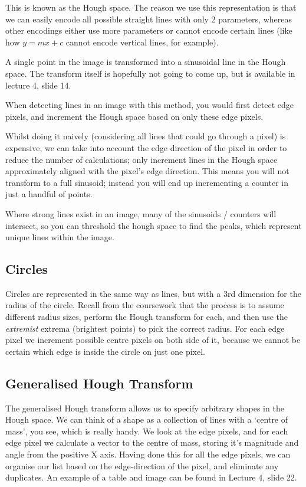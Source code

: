 \documentclass{article}
\begin{document}
    This is known as the Hough space. The reason we use this representation is that we can easily encode all possible straight lines with only 2 parameters, whereas other encodings either use more parameters or cannot encode certain lines (like how $y = mx + c$ cannot encode vertical lines, for example).
    
    A single point in the image is transformed into a sinusoidal line in the Hough space. The transform itself is hopefully not going to come up, but is available in lecture 4, slide 14.
    
    When detecting lines in an image with this method, you would first detect edge pixels, and increment the Hough space based on only these edge pixels.
    
    Whilst doing it naively (considering all lines that could go through a pixel) is expensive, we can take into account the edge direction of the pixel in order to reduce the number of calculations; only increment lines in the Hough space approximately aligned with the pixel’s edge direction. This means you will not transform to a full sinusoid; instead you will end up incrementing a counter in just a handful of points.
    
    Where strong lines exist in an image, many of the sinusoids / counters will intersect, so you can threshold the hough space to find the peaks, which represent unique lines within the image.
    
    \subsection{Circles}
        Circles are represented in the same way as lines, but with a 3rd dimension for the radius of the circle. Recall from the coursework that the process is to assume different radius sizes, perform the Hough transform for each, and then use the \emph{extremist} extrema (brightest points) to pick the correct radius. For each edge pixel we increment possible centre pixels on both side of it, because we cannot be certain which edge is inside the circle on just one pixel.
    
    \subsection{Generalised Hough Transform}
    
        The generalised Hough transform allows us to specify arbitrary shapes in the Hough space. We can think of a shape as a collection of lines with a `centre of mass', you see, which is really handy. We look at the edge pixels, and for each edge pixel we calculate a vector to the centre of mass, storing it's magnitude and angle from the positive X axis. Having done this for all the edge pixels, we can organise our list based on the edge-direction of the pixel, and eliminate any duplicates. An example of a table and image can be found in Lecture 4, slide 22.
    
\end{document}
